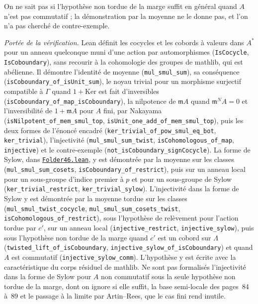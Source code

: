 On ne sait pas si l'hypothèse non tordue de la marge suffit en général quand $A$ n'est pas commutatif ; la démonstration par la moyenne ne le donne pas, et l'on n'a pas cherché de contre-exemple.

\begin{sloppypar}
\begingroup\raggedright
\noindent\emph{Portée de la vérification.} Lean définit les cocycles et les cobords à valeurs dans $A^*$ pour un anneau quelconque muni d'une action par automorphismes (\texttt{IsCocycle}, \texttt{IsCoboundary}), sans recourir à la cohomologie des groupes de mathlib, qui est abélienne. Il démontre l'identité de moyenne (\texttt{mul\_smul\_sum}), sa conséquence (\texttt{isCoboundary\_of\_isUnit\_sum}), le noyau trivial pour un morphisme surjectif compatible à $\Gamma$ quand $1 + \mathrm{Ker}$ est fait d'inversibles (\texttt{isCoboundary\_of\_map\_isCoboundary}), la nilpotence de $\mathfrak mA$ quand $\mathfrak m^NA = 0$ et l'inversibilité de $1 + \mathfrak mA$ pour $A$ fini, par Nakayama (\texttt{isNilpotent\_of\_mem\_smul\_top}, \texttt{isUnit\_one\_add\_of\_mem\_smul\_top}), puis les deux formes de l'énoncé encadré (\texttt{ker\_trivial\_of\_pow\_smul\_eq\_bot}, \texttt{ker\_trivial}), l'injectivité (\texttt{mul\_smul\_sum\_twist}, \texttt{isCohomologous\_of\_map}, \texttt{injective}) et le contre-exemple (\texttt{not\_isCoboundary\_signCocycle}). La forme de Sylow, dans \href{\leanblob/RingTheory/Folder46.lean}{\texttt{Folder46.\allowbreak{}lean}}, y est démontrée par la moyenne sur les classes (\texttt{mul\_smul\_sum\_cosets}, \texttt{isCoboundary\_of\_restrict}), puis sur un anneau local pour un sous-groupe d'indice premier à $p$ et pour un sous-groupe de Sylow (\texttt{ker\_trivial\_restrict}, \texttt{ker\_trivial\_sylow}). L'injectivité dans la forme de Sylow y est démontrée par la moyenne tordue sur les classes (\texttt{mul\_smul\_twist\_cocycle}, \texttt{mul\_smul\_sum\_cosets\_twist}, \texttt{isCohomologous\_of\_restrict}), sous l'hypothèse de relèvement pour l'action tordue par $c'$, sur un anneau local (\texttt{injective\_restrict}, \texttt{injective\_sylow}), puis sous l'hypothèse non tordue de la marge quand $c'$ est un cobord sur $\Lambda$ (\texttt{twisted\_lift\_of\_isCoboundary}, \texttt{injective\_sylow\_of\_isCoboundary}) et quand $A$ est commutatif (\texttt{injective\_sylow\_comm}). L'hypothèse  y est écrite avec la caractéristique du corps résiduel de mathlib. Ne sont pas formalisés l'injectivité dans la forme de Sylow pour $A$ non commutatif sous la seule hypothèse non tordue de la marge, dont on ignore si elle suffit, la base semi-locale des pages~84 à~89 et le passage à la limite par Artin--Rees, que le cas fini rend inutile.
\end{sloppypar}\par\endgroup

